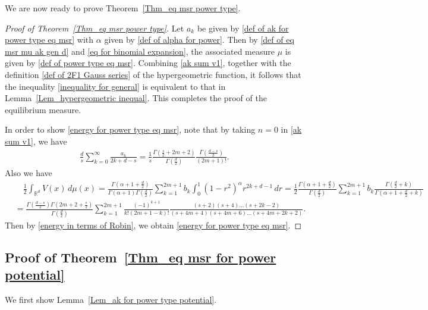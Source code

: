 \documentclass[10pt]{amsart}
\def\R{\mathbb{R}}
\theoremstyle{plain}
\theoremstyle{remark}
\numberwithin{equation}{section}
\begin{document}
We are now ready to prove Theorem~\ref{Thm_eq msr power type}. 

\begin{proof}[Proof of Theorem~\ref{Thm_eq msr power type}]
Let $a_k$ be given by \eqref{def of ak for power type eq msr} with $\alpha$ given by \eqref{def of alpha for power}.  
Then by \eqref{def of eq msr mu ak gen d} and \eqref{eq for binomial expansion}, the associated measure $\mu$ is given by \eqref{def of power type eq msr}.  
Combining \eqref{ak sum v1}, together with the definition \eqref{def of 2F1 Gauss series} of the hypergeometric function, it follows that the inequality \eqref{inequality for general} is equivalent to that in Lemma~\ref{Lem_hypergeometric inequal}. This completes the proof of the equilibrium measure.  

In order to show \eqref{energy for power type eq msr}, note that by taking $n=0$ in \eqref{ak sum v1}, we have  
\begin{align*}
\frac{d}{s}\sum_{k=0}^\infty \frac{ a_k}{ 2k+d-s }  =   \frac{1}{s} \frac{ \Gamma( \frac{s}{2}+2m+2) }{  \Gamma(\frac{d}{2}) }  \frac{   \Gamma( \frac{d-s}{2} ) }{  (2m+1)!} . 
\end{align*}
Also we have 
\begin{align*}
&\quad \frac12 \int_{ \R^d } V(x) \,d\mu(x) = \frac{ \Gamma(\alpha+1+\frac{d}{2}) }{ \Gamma(\alpha+1)\Gamma(\frac{d}{2}) } \sum_{k=1}^{2m+1} b_k \int_0^1 (1-r^2)^\alpha  r^{2k+d-1}\,dr  = \frac12\frac{ \Gamma(\alpha+1+\frac{d}{2}) }{  \Gamma(\frac{d}{2}) } \sum_{k=1}^{2m+1} b_k \frac{ \Gamma(\frac{d}{2}+k) } { \Gamma(\alpha+1+\frac{d}{2}+k) }  
\\
&=       \frac{ \Gamma(\frac{d-s}{2})  \Gamma(2m+2+\frac{s}{2} ) }{  \Gamma(\frac{d}{2})   }   \sum_{k=1}^{2m+1}  \frac{ (-1)^{k+1}  }{  k!(2m+1-k)!  } \frac{(s+2)(s+4)\dots(s+2k-2)}{ (s+4m+4)(s+4m+6)\dots(s+4m+2k+2) }. 
\end{align*}
Then by \eqref{energy in terms of Robin}, we obtain \eqref{energy for power type eq msr}.  
\end{proof}


\subsection{Proof of Theorem~\ref{Thm_eq msr for power potential}}
  
We first show Lemma~\ref{Lem_ak for power type potential}. 
\end{document}
